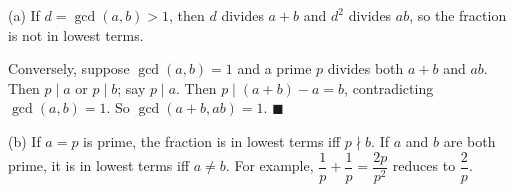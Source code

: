 (a) If $d=\gcd(a,b)>1$, then $d$ divides $a+b$ and $d^2$ divides $ab$, so the fraction is not in lowest terms.

Conversely, suppose $\gcd(a,b)=1$ and a prime $p$ divides both $a+b$ and $ab$. Then $p\mid a$ or $p\mid b$; say $p\mid a$. Then $p\mid(a+b)-a=b$, contradicting $\gcd(a,b)=1$. So $\gcd(a+b,ab)=1$. $\blacksquare$

(b) If $a=p$ is prime, the fraction is in lowest terms iff $p\nmid b$. If $a$ and $b$ are both prime, it is in lowest terms iff $a\ne b$. For example, $\dfrac1p+\dfrac1p=\dfrac{2p}{p^2}$ reduces to $\dfrac2p$.
